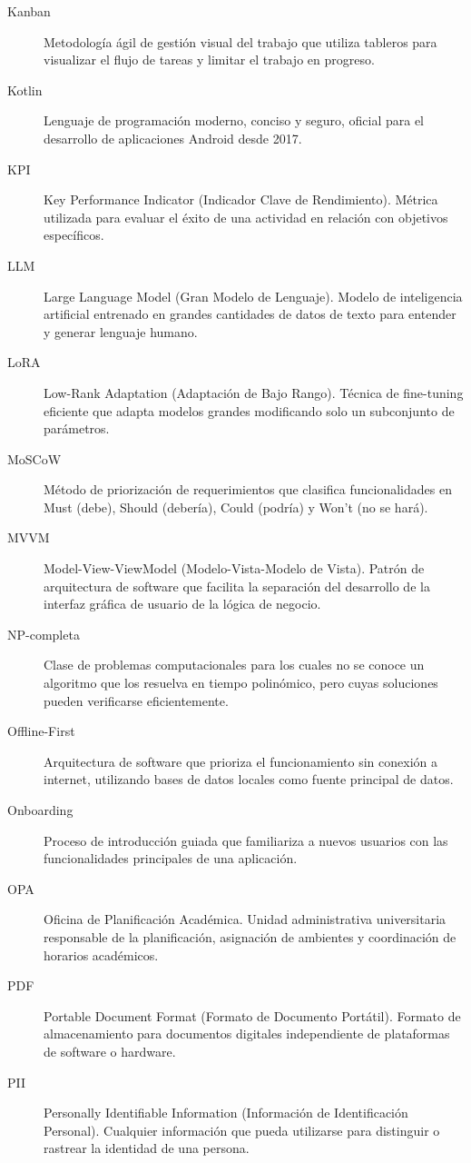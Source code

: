 \begin{description}
    \item[Kanban] Metodología ágil de gestión visual del trabajo que utiliza tableros para visualizar el flujo de tareas y limitar el trabajo en progreso.
    \item[Kotlin] Lenguaje de programación moderno, conciso y seguro, oficial para el desarrollo de aplicaciones Android desde 2017.
    \item[KPI] Key Performance Indicator (Indicador Clave de Rendimiento). Métrica utilizada para evaluar el éxito de una actividad en relación con objetivos específicos.
    \item[LLM] Large Language Model (Gran Modelo de Lenguaje). Modelo de inteligencia artificial entrenado en grandes cantidades de datos de texto para entender y generar lenguaje humano.
    \item[LoRA] Low-Rank Adaptation (Adaptación de Bajo Rango). Técnica de fine-tuning eficiente que adapta modelos grandes modificando solo un subconjunto de parámetros.
    \item[MoSCoW] Método de priorización de requerimientos que clasifica funcionalidades en Must (debe), Should (debería), Could (podría) y Won't (no se hará).
    \item[MVVM] Model-View-ViewModel (Modelo-Vista-Modelo de Vista). Patrón de arquitectura de software que facilita la separación del desarrollo de la interfaz gráfica de usuario de la lógica de negocio.
    \item[NP-completa] Clase de problemas computacionales para los cuales no se conoce un algoritmo que los resuelva en tiempo polinómico, pero cuyas soluciones pueden verificarse eficientemente.
    \item[Offline-First] Arquitectura de software que prioriza el funcionamiento sin conexión a internet, utilizando bases de datos locales como fuente principal de datos.
    \item[Onboarding] Proceso de introducción guiada que familiariza a nuevos usuarios con las funcionalidades principales de una aplicación.
    \item[OPA] Oficina de Planificación Académica. Unidad administrativa universitaria responsable de la planificación, asignación de ambientes y coordinación de horarios académicos.
    \item[PDF] Portable Document Format (Formato de Documento Portátil). Formato de almacenamiento para documentos digitales independiente de plataformas de software o hardware.
    \item[PII] Personally Identifiable Information (Información de Identificación Personal). Cualquier información que pueda utilizarse para distinguir o rastrear la identidad de una persona.

\end{description}
